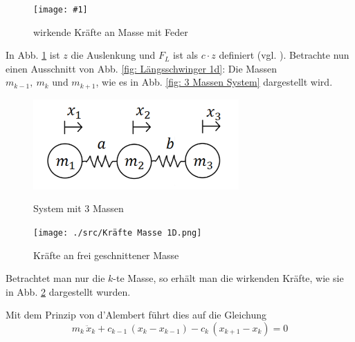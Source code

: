 \documentclass[a4paper,12pt]{report}
\newcommand{\bild}[4]{
      \begin{figure}[!htp]
            \centering
            \texttt{[image: \#1]}
            \caption{#3}
            #4
      \end{figure}
}
\newcommand{\1}{\mathds{1}}
\theoremstyle{plain} %
\theoremstyle{definition} %
\theoremstyle{remark}
\begin{document}
            \bild{Federkraft und Trägheitskraft.png}{0.4}{wirkende Kräfte an Masse mit Feder \cite{federkraft}}{\label{fig: KräfteAnFeder}}
            
            In Abb. \ref{fig: KräfteAnFeder} ist $z$ die Auslenkung und $F_L$ ist als $c\cdot z$ definiert (vgl. \cite{federkraft}).
            Betrachte nun einen Ausschnitt von Abb. \ref{fig: Längsschwinger 1d}: Die Massen $m_{k-1},\ m_k\text{ und }m_{k+1}$, wie es in Abb. \ref{fig: 3 Massen System} dargestellt wird.

            \begin{figure}[ht]
                  \centering
                  \begin{minipage}[ht]{0.49\linewidth}
                        \centering
                        \includegraphics[width=0.7\textwidth, keepaspectratio]{./src/3 Massen System.png}
                        \caption{System mit 3 Massen}
                        \label{fig: 3 Massen System}
                  \end{minipage}
                  \hfill
                  \begin{minipage}[ht]{0.49\linewidth}
                        \centering
                        \texttt{[image: ./src/Kräfte Masse 1D.png]}
                        \caption{Kräfte an frei geschnittener Masse}
                        \label{fig: Kräfte Masse 1D}
                  \end{minipage}
            \end{figure}

            Betrachtet man nur die $k$-te Masse, so erhält man die wirkenden Kräfte, wie sie in Abb. \ref{fig: Kräfte Masse 1D} dargestellt wurden.

            Mit dem Prinzip von d'Alembert führt dies auf die Gleichung
            \begin{equation}
                  \label{eqn: Gl für kte Masse}
                  m_k\,\ddot x_k + c_{k-1}\,(x_k-x_{k-1}) - c_k\,(x_{k+1}-x_k) = 0
            \end{equation}
\end{document}
